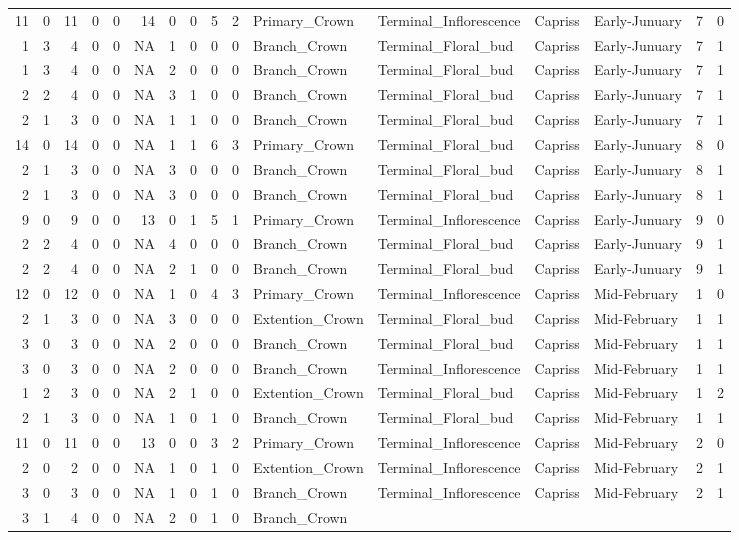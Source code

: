 \documentclass[]{article}
\begin{document}
\begin{longtable}[]{@{}rrrrrrrrrrllllrl@{}}
11 & 0 & 11 & 0 & 0 & 14 & 0 & 0 & 5 & 2 & Primary\_Crown &
Terminal\_Inflorescence & Capriss & Early-Junuary & 7 & 0\tabularnewline
1 & 3 & 4 & 0 & 0 & NA & 1 & 0 & 0 & 0 & Branch\_Crown &
Terminal\_Floral\_bud & Capriss & Early-Junuary & 7 & 1\tabularnewline
1 & 3 & 4 & 0 & 0 & NA & 2 & 0 & 0 & 0 & Branch\_Crown &
Terminal\_Floral\_bud & Capriss & Early-Junuary & 7 & 1\tabularnewline
2 & 2 & 4 & 0 & 0 & NA & 3 & 1 & 0 & 0 & Branch\_Crown &
Terminal\_Floral\_bud & Capriss & Early-Junuary & 7 & 1\tabularnewline
2 & 1 & 3 & 0 & 0 & NA & 1 & 1 & 0 & 0 & Branch\_Crown &
Terminal\_Floral\_bud & Capriss & Early-Junuary & 7 & 1\tabularnewline
14 & 0 & 14 & 0 & 0 & NA & 1 & 1 & 6 & 3 & Primary\_Crown &
Terminal\_Floral\_bud & Capriss & Early-Junuary & 8 & 0\tabularnewline
2 & 1 & 3 & 0 & 0 & NA & 3 & 0 & 0 & 0 & Branch\_Crown &
Terminal\_Floral\_bud & Capriss & Early-Junuary & 8 & 1\tabularnewline
2 & 1 & 3 & 0 & 0 & NA & 3 & 0 & 0 & 0 & Branch\_Crown &
Terminal\_Floral\_bud & Capriss & Early-Junuary & 8 & 1\tabularnewline
9 & 0 & 9 & 0 & 0 & 13 & 0 & 1 & 5 & 1 & Primary\_Crown &
Terminal\_Inflorescence & Capriss & Early-Junuary & 9 & 0\tabularnewline
2 & 2 & 4 & 0 & 0 & NA & 4 & 0 & 0 & 0 & Branch\_Crown &
Terminal\_Floral\_bud & Capriss & Early-Junuary & 9 & 1\tabularnewline
2 & 2 & 4 & 0 & 0 & NA & 2 & 1 & 0 & 0 & Branch\_Crown &
Terminal\_Floral\_bud & Capriss & Early-Junuary & 9 & 1\tabularnewline
12 & 0 & 12 & 0 & 0 & NA & 1 & 0 & 4 & 3 & Primary\_Crown &
Terminal\_Inflorescence & Capriss & Mid-February & 1 & 0\tabularnewline
2 & 1 & 3 & 0 & 0 & NA & 3 & 0 & 0 & 0 & Extention\_Crown &
Terminal\_Floral\_bud & Capriss & Mid-February & 1 & 1\tabularnewline
3 & 0 & 3 & 0 & 0 & NA & 2 & 0 & 0 & 0 & Branch\_Crown &
Terminal\_Floral\_bud & Capriss & Mid-February & 1 & 1\tabularnewline
3 & 0 & 3 & 0 & 0 & NA & 2 & 0 & 0 & 0 & Branch\_Crown &
Terminal\_Inflorescence & Capriss & Mid-February & 1 & 1\tabularnewline
1 & 2 & 3 & 0 & 0 & NA & 2 & 1 & 0 & 0 & Extention\_Crown &
Terminal\_Floral\_bud & Capriss & Mid-February & 1 & 2\tabularnewline
2 & 1 & 3 & 0 & 0 & NA & 1 & 0 & 1 & 0 & Branch\_Crown &
Terminal\_Floral\_bud & Capriss & Mid-February & 1 & 1\tabularnewline
11 & 0 & 11 & 0 & 0 & 13 & 0 & 0 & 3 & 2 & Primary\_Crown &
Terminal\_Inflorescence & Capriss & Mid-February & 2 & 0\tabularnewline
2 & 0 & 2 & 0 & 0 & NA & 1 & 0 & 1 & 0 & Extention\_Crown &
Terminal\_Inflorescence & Capriss & Mid-February & 2 & 1\tabularnewline
3 & 0 & 3 & 0 & 0 & NA & 1 & 0 & 1 & 0 & Branch\_Crown &
Terminal\_Inflorescence & Capriss & Mid-February & 2 & 1\tabularnewline
3 & 1 & 4 & 0 & 0 & NA & 2 & 0 & 1 & 0 & Branch\_Crown &

\end{longtable}
\end{document}
